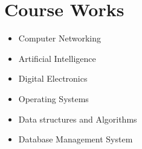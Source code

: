 \documentclass[letterpaper,11pt]{article}
\newcommand{\resumeItem}[1]{
  \item\small{
    {#1 \vspace{-2pt}}
  }
}
\newcommand{\resumeItemListStart}{\begin{itemize}}
\newcommand{\resumeItemListEnd}{\end{itemize}\vspace{-5pt}}
\begin{document}
%
 
 
\smallskip
\section{Course Works }
\begin{multicols}{2}
 \begin{itemize}[leftmargin=0.15in, label={}]
    \resumeItemListStart
        \resumeItem{Computer Networking}
        \resumeItem{Artificial Intelligence}
        \resumeItem{Digital Electronics}
        \resumeItem{Operating Systems}
        \resumeItem{Data structures and Algorithms}
        \resumeItem{Database Management System}
      \resumeItemListEnd
 \end{itemize}
 \end{multicols}
 \vspace{-16pt}
 
\end{document}
